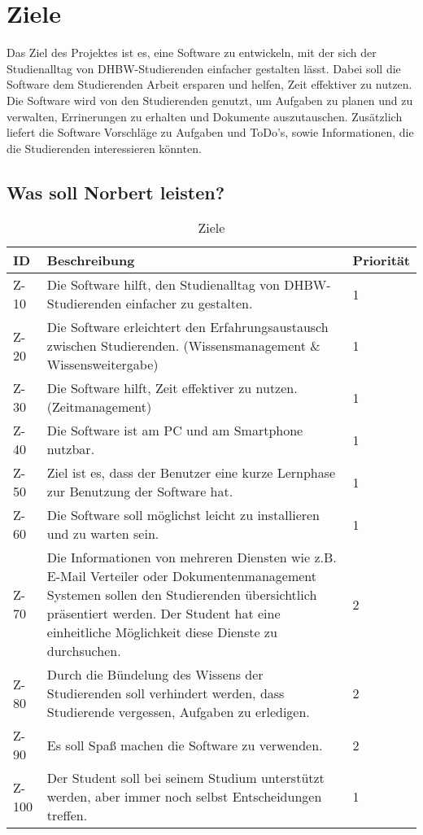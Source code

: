 
\chapter{Ziele}
Das Ziel des Projektes ist es, eine Software zu entwickeln, mit der sich der Studienalltag von DHBW-Studierenden einfacher gestalten lässt. Dabei soll die Software dem Studierenden Arbeit ersparen und helfen, Zeit effektiver zu nutzen. Die Software wird von den Studierenden genutzt, um  Aufgaben zu planen und zu verwalten, Errinerungen zu erhalten und Dokumente auszutauschen. Zusätzlich liefert die Software Vorschläge zu Aufgaben und ToDo's, sowie Informationen, die die Studierenden interessieren könnten. 

\section{Was soll Norbert leisten?}
\begin{table}[H]
\caption{Ziele}
\label{ziele:entwicklungsziele}
\begin{tabularx}{\textwidth}{|l|X|l|}
\toprule
\textbf{ID} & \textbf{Beschreibung} & \textbf{Priorität}\\
\endhead
\hline
Z-10 & Die Software hilft, den Studienalltag von DHBW-Studierenden einfacher zu gestalten. & 1 \\
Z-20 & Die Software erleichtert den Erfahrungsaustausch zwischen Studierenden. (Wissensmanagement \& Wissensweitergabe) & 1 \\
Z-30 & Die Software hilft, Zeit effektiver zu nutzen. (Zeitmanagement) & 1\\
Z-40 & Die Software ist am PC und am Smartphone nutzbar. & 1\\
Z-50 & Ziel ist es, dass der Benutzer eine kurze Lernphase zur Benutzung der Software hat. & 1 \\
Z-60 & Die Software soll möglichst leicht zu installieren und zu warten sein. & 1 \\
Z-70 & Die Informationen von mehreren Diensten wie z.B. E-Mail Verteiler oder Dokumentenmanagement Systemen sollen den Studierenden übersichtlich präsentiert werden. Der Student hat eine einheitliche Möglichkeit diese Dienste zu durchsuchen. & 2 \\
Z-80 & Durch die Bündelung des Wissens der Studierenden soll verhindert werden, dass Studierende vergessen, Aufgaben zu erledigen. & 2 \\
Z-90 & Es soll Spaß machen die Software zu verwenden. & 2 \\
Z-100 & Der Student soll bei seinem Studium unterstützt werden, aber immer noch selbst Entscheidungen treffen. & 1 \\
\hline
\end{tabularx}
\end{table}

